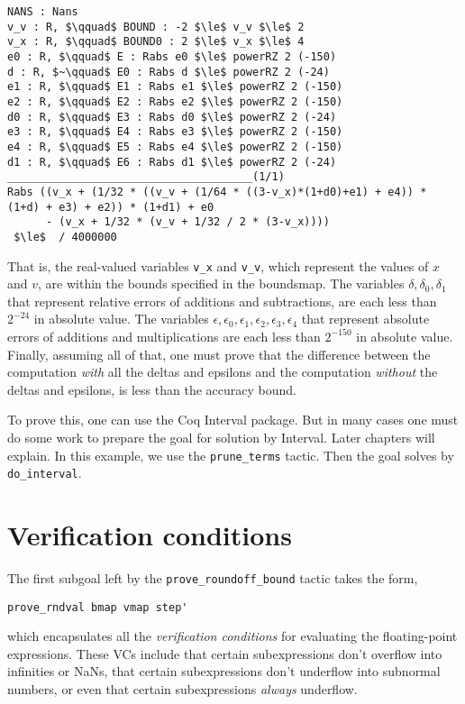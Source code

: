 \documentclass[article]{memoir}
\begin{document}
\begin{lstlisting}
NANS : Nans
v_v : R, $\qquad$ BOUND : -2 $\le$ v_v $\le$ 2
v_x : R, $\qquad$ BOUND0 : 2 $\le$ v_x $\le$ 4
e0 : R, $\qquad$ E : Rabs e0 $\le$ powerRZ 2 (-150)
d : R, $~\qquad$ E0 : Rabs d $\le$ powerRZ 2 (-24)
e1 : R, $\qquad$ E1 : Rabs e1 $\le$ powerRZ 2 (-150)
e2 : R, $\qquad$ E2 : Rabs e2 $\le$ powerRZ 2 (-150)
d0 : R, $\qquad$ E3 : Rabs d0 $\le$ powerRZ 2 (-24)
e3 : R, $\qquad$ E4 : Rabs e3 $\le$ powerRZ 2 (-150)
e4 : R, $\qquad$ E5 : Rabs e4 $\le$ powerRZ 2 (-150)
d1 : R, $\qquad$ E6 : Rabs d1 $\le$ powerRZ 2 (-24)
______________________________________(1/1)
Rabs ((v_x + (1/32 * ((v_v + (1/64 * ((3-v_x)*(1+d0)+e1) + e4)) * (1+d) + e3) + e2)) * (1+d1) + e0
      - (v_x + 1/32 * (v_v + 1/32 / 2 * (3-v_x))))
 $\le$  / 4000000
\end{lstlisting}
\label{stage2proofgoal}
That is, the real-valued variables \lstinline{v_x} and \lstinline{v_v},
which represent the values of $x$ and $v$, are within the bounds
specified in the boundsmap.  The variables 
$\delta,\delta_0,\delta_1$ that represent
relative errors of additions and subtractions, are each less than
$2^{-24}$ in absolute value.  The variables 
$\epsilon,\epsilon_0,\epsilon_1,\epsilon_2,\epsilon_3,\epsilon_4$ that
represent absolute errors of additions and multiplications
are each less than $2^{-150}$ in absolute value.
Finally, assuming all of that, one must prove that the
difference between the computation \emph{with} all the
deltas and epsilons and the computation \emph{without}
the deltas and epsilons, is less than the accuracy bound.

To prove this, one can use the Coq Interval package.  But in many
cases one must do some work to prepare the goal for solution by
Interval.  Later chapters will explain.
In this example, we use the \lstinline{prune_terms} tactic.
Then the goal solves by \lstinline{do_interval}.

\chapter{Verification conditions}
\label{goal1}
The first subgoal left by the \lstinline{prove_roundoff_bound} tactic
takes the form,
\begin{lstlisting}
prove_rndval bmap vmap step'
\end{lstlisting}
which encapsulates all the \emph{verification conditions} for
evaluating the floating-point expressions.  These VCs include that
certain subexpressions don't overflow into infinities or NaNs,
that certain subexpressions don't underflow into subnormal numbers,
or even that certain subexpressions \emph{always} underflow.
\end{document}
